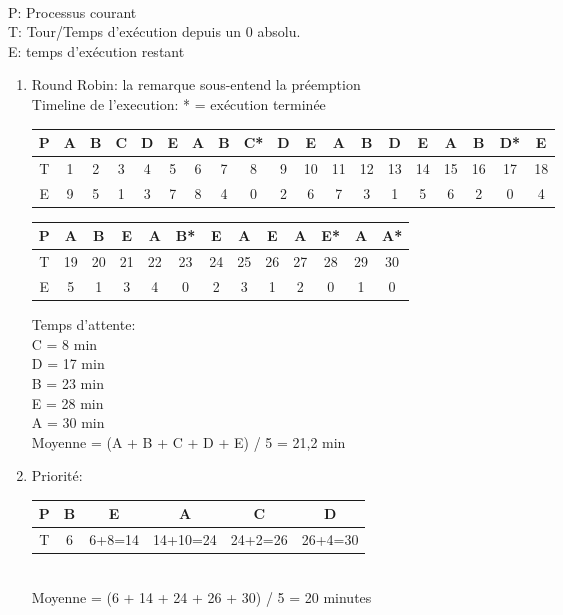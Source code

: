 \begin{enumerate}
\begin{correction}\\
P: Processus courant\\
T: Tour/Temps d’exécution depuis un 0 absolu.\\
E: temps d'exécution restant\\

\begin{enumerate}[label=(\alph*)]

\item Round Robin: la remarque sous-entend la préemption\\
      Timeline de l’execution: * = exécution terminée

      \begin{tabular}{|c||c|c|c|c|c|c|c|c|c|c|c|c|c|c|c|c|c|c|}
      \hline
      P & A & B & C & D & E & A & B & C{*} & D & E & A & B & D & E & A & B & D{*} & E\tabularnewline
      \hline
      T & 1 & 2 & 3 & 4 & 5 & 6 & 7 & 8 & 9 & 10 & 11 & 12 & 13 & 14 & 15 & 16 & 17 & 18\tabularnewline
      \hline
      E & 9 & 5 & 1 & 3 & 7 & 8 & 4 & 0 & 2 & 6 & 7 & 3 & 1 & 5 & 6 & 2 & 0 & 4\tabularnewline
      \hline
      \end{tabular}

      \begin{tabular}{|c||c|c|c|c|c|c|c|c|c|c|c|c|}
      \hline
      P & A & B & E & A & B{*} & E & A & E & A & E{*} & A & A{*}\tabularnewline
      \hline
      T & 19 & 20 & 21 & 22 & 23 & 24 & 25 & 26 & 27 & 28 & 29 & 30\tabularnewline
      \hline
      E & 5 & 1 & 3 & 4 & 0 & 2 & 3 & 1 & 2 & 0 & 1 & 0\tabularnewline
      \hline
      \end{tabular}

      Temps d’attente:\\
      C = 8 min\\
      D = 17 min\\
      B = 23 min\\
      E = 28 min\\
      A = 30 min\\
      Moyenne = (A + B + C + D + E) / 5 = 21,2 min

\item Priorité:\\
      \begin{tabular}{|c||c|c|c|c|c|}
      \hline
      P & B & E & A & C & D\tabularnewline
      \hline
      T & 6 & 6+8=14 & 14+10=24 & 24+2=26 & 26+4=30\tabularnewline
      \hline
      \end{tabular}\\
      Moyenne = (6 + 14 + 24 + 26 + 30) / 5 = 20 minutes


\end{enumerate}
\end{correction}
\end{enumerate}
